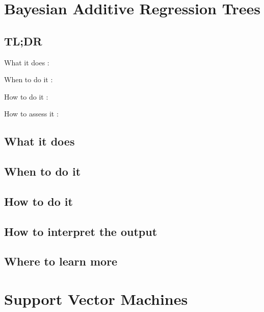 \documentclass[
]{book}
\begin{document}
\hypertarget{bayesian-additive-regression-trees}{%
\chapter{Bayesian Additive Regression Trees}\label{bayesian-additive-regression-trees}}

\hypertarget{tldr-19}{%
\section{TL;DR}\label{tldr-19}}

What it does
:

When to do it
:

How to do it
:

How to assess it
:

\hypertarget{what-it-does-19}{%
\section{What it does}\label{what-it-does-19}}

\hypertarget{when-to-do-it-19}{%
\section{When to do it}\label{when-to-do-it-19}}

\hypertarget{how-to-do-it-19}{%
\section{How to do it}\label{how-to-do-it-19}}

\hypertarget{how-to-interpret-the-output-19}{%
\section{How to interpret the output}\label{how-to-interpret-the-output-19}}

\hypertarget{where-to-learn-more-19}{%
\section{Where to learn more}\label{where-to-learn-more-19}}

\hypertarget{support-vector-machines}{%
\chapter{Support Vector Machines}\label{support-vector-machines}}
\end{document}
